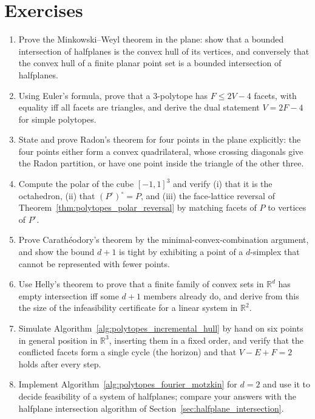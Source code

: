 \section{Exercises}
\label{sec:polytopes_exercises}

\begin{enumerate}
  \item Prove the Minkowski--Weyl theorem in the plane: show that a bounded
    intersection of halfplanes is the convex hull of its vertices, and
    conversely that the convex hull of a finite planar point set is a
    bounded intersection of halfplanes.
  \item Using Euler's formula, prove that a $3$-polytope has $F \le 2V - 4$
    facets, with equality iff all facets are triangles, and derive the dual
    statement $V = 2F - 4$ for simple polytopes.
  \item State and prove Radon's theorem for four points in the plane
    explicitly: the four points either form a convex quadrilateral, whose
    crossing diagonals give the Radon partition, or have one point inside
    the triangle of the other three.
  \item Compute the polar of the cube $[-1,1]^3$ and verify (i) that it is
    the octahedron, (ii) that $(P^{\circ})^{\circ} = P$, and (iii) the
    face-lattice reversal of Theorem~\ref{thm:polytopes_polar_reversal} by
    matching facets of $P$ to vertices of $P^{\circ}$.
  \item Prove Carath\'eodory's theorem by the minimal-convex-combination
    argument, and show the bound $d+1$ is tight by exhibiting a point of a
    $d$-simplex that cannot be represented with fewer points.
  \item Use Helly's theorem to prove that a finite family of convex sets in
    $\mathbb{R}^d$ has empty intersection iff some $d+1$ members already do,
    and derive from this the size of the infeasibility certificate for a
    linear system in $\mathbb{R}^2$.
  \item Simulate Algorithm~\ref{alg:polytopes_incremental_hull} by hand on
    six points in general position in $\mathbb{R}^3$, inserting them in a
    fixed order, and verify that the conflicted facets form a single cycle
    (the horizon) and that $V - E + F = 2$ holds after every step.
  \item Implement Algorithm~\ref{alg:polytopes_fourier_motzkin} for $d = 2$
    and use it to decide feasibility of a system of halfplanes; compare your
    answers with the halfplane intersection algorithm of
    Section~\ref{sec:halfplane_intersection}.
\end{enumerate}
